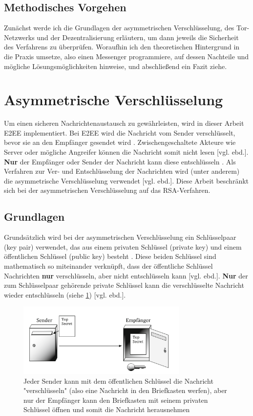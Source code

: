 \documentclass[a4paper,ngerman, headheight=28pt,12pt, footheight=27pt]{scrartcl}
\newcommand{\vcite}[1]{\cite[vgl.][]{#1}}
\newcommand{\vebd}{[vgl. ebd.]}
\begin{document}
\subsection{Methodisches Vorgehen}
Zunächst werde ich die Grundlagen der asymmetrischen Verschlüsselung, des Tor-Netzwerks und der Dezentralisierung erläutern, um dann jeweils die Sicherheit des Verfahrens zu überprüfen. Woraufhin ich den theoretischen Hintergrund in die Praxis umsetze, also einen Messenger programmiere, auf dessen Nachteile und mögliche Lösungsmöglichkeiten hinweise, und abschließend ein Fazit ziehe.

\section{Asymmetrische Verschlüsselung}
Um einen sicheren Nachrichtenaustausch zu gewährleisten, wird in dieser Arbeit E2EE implementiert. Bei E2EE wird die Nachricht vom Sender verschlüsselt, bevor sie an den Empfänger gesendet wird \vcite{E2EE}. Zwischengeschaltete Akteure wie Server oder mögliche Angreifer können die Nachricht somit nicht lesen \vebd. \textbf{Nur} der Empfänger oder Sender der Nachricht kann diese entschlüsseln \vcite{E2EE-Method}. Als Verfahren zur Ver- und Entschlüsselung der Nachrichten wird (unter anderem) die asymmetrische Verschlüsselung verwendet \vebd. Diese Arbeit beschränkt sich bei der asymmetrischen Verschlüsselung auf das RSA-Verfahren.

\subsection{Grundlagen}
Grundsätzlich wird bei der asymmetrischen Verschlüsselung ein Schlüsselpaar (key pair) verwendet, das aus einem privaten Schlüssel (private key) und einem öffentlichen Schlüssel (public key) besteht \vcite{Rsa-Basics}. Diese beiden Schlüssel sind mathematisch so miteinander verknüpft, dass der öffentliche Schlüssel Nachrichten \textbf{nur} verschlüsseln, aber nicht entschlüsseln kann \vebd. \textbf{Nur} der zum Schlüsselpaar gehörende private Schlüssel kann die verschlüsselte Nachricht wieder entschlüsseln (siehe \cref{fig:E2EE}) \vebd.
\begin{figure}[H]
  \centering
  \includegraphics[width=0.75\textwidth]{Briefkasten-asymm.png}
  \caption{Jeder Sender kann mit dem öffentlichen Schlüssel die Nachricht "verschlüsseln" (also eine Nachricht in den Briefkasten werfen), aber nur der Empfänger kann den Briefkasten mit seinem privaten Schlüssel öffnen und somit die Nachricht herausnehmen \vcite{fig:Rsa-Cryptography} \label{fig:E2EE}}
\end{figure}
\end{document}
